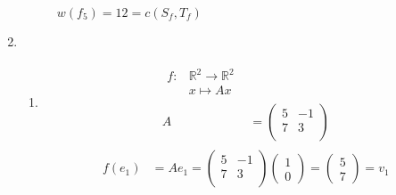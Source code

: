 \documentclass[a4paper]{scrartcl}
\begin{document}
\begin{enumerate}[label=\bfseries\arabic*.]
\begin{figure}[h]
            \caption{$w(f_5) = 12 = c(S_f, T_f)$}
            \label{fig:ek5}
        \end{figure}

        \FloatBarrier

    \item
        \begin{enumerate}
            \item
                \begin{align}
                    \begin{split}
                        f \colon& \mathbb{R}^2 \to \mathbb{R}^2 \\
                        & x \mapsto Ax
                    \end{split} \\
                    A &=
                    \begin{pmatrix}
                        5 & -1 \\
                        7 &  3 \\
                    \end{pmatrix}
                \end{align}
                \begin{align}
                    \begin{split}
                        f(e_1) &= Ae_1 =
                        \begin{pmatrix}
                            5 & -1 \\
                            7 &  3 \\
                        \end{pmatrix}
                        \begin{pmatrix}
                            1 \\ 0
                        \end{pmatrix}
                        =
                        \begin{pmatrix}
                            5 \\ 7
                        \end{pmatrix}
                        = v_1
                    \end{split} \\

\end{align}
\end{enumerate}
\end{enumerate}
\end{document}
